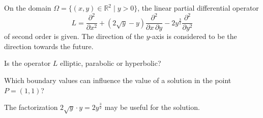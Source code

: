 On the domain 
$
\Omega
=
\{ (x,y)\in\mathbb{R}^2 \mid y>0\}
$,
the linear partial differential operator
\[
L
=
\frac{\partial^2}{\partial x^2}
+
(2\!\sqrt{y}-y)
\frac{\partial^2}{\partial x\,\partial y}
-
2y^{\frac32}
\frac{\partial^2}{\partial y^2}
\]
of second order is given.
The direction of the $y$-axis is considered to be the direction
towards the future.
\begin{teilaufgaben}
\item
Is the operator $L$ elliptic, parabolic or hyperbolic?
\item
Which boundary values can influence the value of a solution
in the point $P=(1,1)$?
\end{teilaufgaben}

\begin{hinweis}
The factorization $2\!\sqrt{y}\cdot y=2y^{\frac32}$ may be useful
for the solution.
\end{hinweis}

